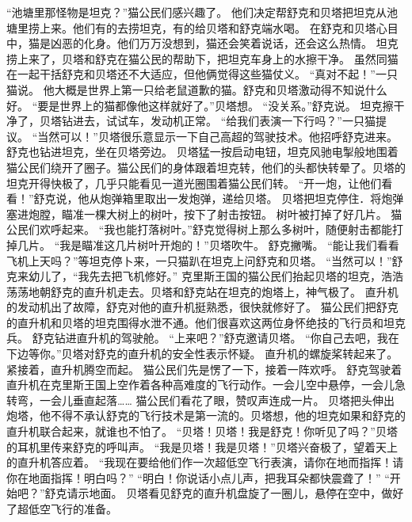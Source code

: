 \documentclass[a4paper,12pt,UTF8,twoside]{ctexbook}
\begin{document}
        “池塘里那怪物是坦克？”猫公民们感兴趣了。 
        他们决定帮舒克和贝塔把坦克从池塘里捞上来。他们有的去捞坦克，有的给贝塔和舒克端水喝。 
        在舒克和贝塔心目中，猫是凶恶的化身。他们万万没想到，猫还会笑着说话，还会这么热情。 
        坦克捞上来了，贝塔和舒克在猫公民的帮助下，把坦克车身上的水擦干净。 
        虽然同猫在一起干括舒克和贝塔还不大适应，但他俩觉得这些猫仗义。 
        “真对不起！”一只猫说。 
        他大概是世界上第一只给老鼠道歉的猫。舒克和贝塔激动得不知说什么好。 
        “要是世界上的猫都像他这样就好了。”贝塔想。 
        “没关系。”舒克说。 
        坦克擦干净了，贝塔钻进去，试试车，发动机正常。 
        “给我们表演一下行吗？”一只猫提议。 
        “当然可以！”贝塔很乐意显示一下自己高超的驾驶技术。他招呼舒克进来。 
        舒克也钻进坦克，坐在贝塔旁边。 
        贝塔猛一按启动电钮，坦克风驰电掣般地围着猫公民们绕开了圈子。猫公民们的身体跟着坦克转，他们的头都快转晕了。贝塔的坦克开得快极了，几乎只能看见一道光圈围着猫公民们转。 
        “开一炮，让他们看看！”舒克说，他从炮弹箱里取出一发炮弹，递给贝塔。 
        贝塔把坦克停住．将炮弹塞进炮膛，瞄准一棵大树上的树叶，按下了射击按钮。 
        树叶被打掉了好几片。 
        猫公民们欢呼起来。 
        “我也能打落树叶。”舒克觉得树上那么多树叶，随便射击都能打掉几片。 
        “我是瞄准这几片树叶开炮的！”贝塔吹牛。 
        舒克撇嘴。 
        “能让我们看看飞机上天吗？”等坦克停卜来，一只猫趴在坦克上问舒克和贝塔。 
        “当然可以！”舒克来幼儿了，“我先去把飞机修好。” 
        克里斯王国的猫公民们抬起贝塔的坦克，浩浩荡荡地朝舒克的直升机走去。贝塔和舒克站在坦克的炮塔上，神气极了。 
        直升机的发动机出了故障，舒克对他的直升机挺熟悉，很快就修好了。 
        猫公民们把舒克的直升机和贝塔的坦克围得水泄不通。他们很喜欢这两位身怀绝技的飞行员和坦克兵。 
        舒克钻进直升机的驾驶舱。 
        “上来吧？”舒克邀请贝塔。 
        “你自己去吧，我在下边等你。”贝塔对舒克的直升机的安全性表示怀疑。 
        直升机的螺旋桨转起来了。紧接着，直升机腾空而起。 
        猫公民们先是愣了一下，接着一阵欢呼。 
        舒克驾驶着直升机在克里斯王国上空作着各种高难度的飞行动作。一会儿空中悬停，一会儿急转弯，一会儿垂直起落…… 
        猫公民们看花了眼，赞叹声连成一片。 
        贝塔把头伸出炮塔，他不得不承认舒克的飞行技术是第一流的。贝塔想，他的坦克如果和舒克的直升机联合起来，就谁也不怕了。 
        “贝塔！贝塔！我是舒克！你听见了吗？”贝塔的耳机里传来舒克的呼叫声。 
        “我是贝塔！我是贝塔！”贝塔兴奋极了，望着天上的直升机答应着。 
        “我现在要给他们作一次超低空飞行表演，请你在地而指挥！请你在地面指挥！明白吗？” 
        “明白！你说话小点儿声，把我耳朵都快震聋了！” 
        “开始吧？”舒克请示地面。 
        贝塔看见舒克的直升机盘旋了一圈儿，悬停在空中，做好了超低空飞行的准备。 
\end{document}
